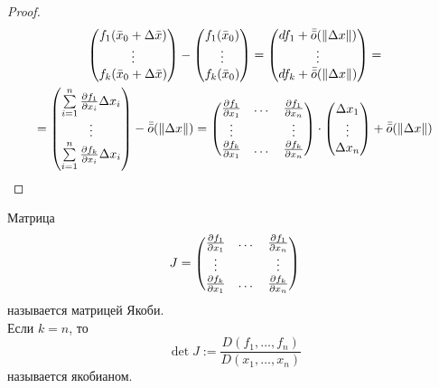\begin{proof}
    \begin{multline*}
        \begin{pmatrix}
            f_1(\bar{x}_0+\Delta \bar{x})\\
            \vdots\\
            f_k(\bar{x}_0+\Delta \bar{x})
        \end{pmatrix}
        -\begin{pmatrix}
            f_1(\bar{x}_0)\\
            \vdots\\
            f_k(\bar{x}_0)
        \end{pmatrix}
        =\begin{pmatrix}
            df_1+\bar{\bar{o}}{(\|\Delta x\|)}\\
            \vdots\\
            df_k+\bar{\bar{o}}{(\|\Delta x\|)}
        \end{pmatrix}=
        \\=\begin{pmatrix}
            \sum\limits_{i=1}^{n}\frac{\partial {f_1}}{\partial {x_i}}\Delta x_i\\
            \vdots\\
            \sum\limits_{i=1}^{n}\frac{\partial {f_k}}{\partial {x_i}}\Delta x_i
        \end{pmatrix}-\bar{\bar{o}}{(\|\Delta x\|)}=
        \begin{pmatrix}
            \frac{\partial {f_1}}{\partial {x_1}} & \dots & \frac{\partial {f_1}}{\partial {x_n}}\\
            \vdots & \null & \vdots\\
            \frac{\partial {f_k}}{\partial {x_1}} & \dots & \frac{\partial {f_k}}{\partial {x_n}}
        \end{pmatrix}
        \cdot 
        \begin{pmatrix}
            \Delta x_1\\
            \vdots\\
            \Delta x_n
        \end{pmatrix}    
        +\bar{\bar{o}}{(\|\Delta x\|)}    
    \end{multline*} 
\end{proof} 
    \begin{definition}
        Матрица
        \[J=\begin{pmatrix}
            \frac{\partial {f_1}}{\partial {x_1}} & \dots & \frac{\partial {f_1}}{\partial {x_n}}\\
            \vdots & \null & \vdots\\
            \frac{\partial {f_k}}{\partial {x_1}} & \dots & \frac{\partial {f_k}}{\partial {x_n}}
        \end{pmatrix}\]
        называется матрицей Якоби.\\
        Если $k=n$, то 
        \[\det{J}:=\frac{D(f_1,\dots,f_n)}{D(x_1,\dots,x_n)}\]
        называется якобианом.
    \end{definition} 
